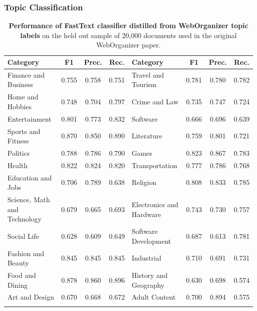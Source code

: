 \documentclass[table]{ai2style/ai2}
\begin{document}
{{\subsubsection{Topic Classification}
\begin{table}[htbp]
\centering
\begin{tabular}{@{}lccc|lccc@{}}
\toprule
{\bf Category} & {\bf F1} & {\bf Prec.} & {\bf Rec.} & {\bf Category} & {\bf F1} & {\bf Prec.} & {\bf Rec.} \\
\midrule
\rowcolor{ai2offwhite} Finance and Business & 0.755 & 0.758 & 0.751 & Travel and Tourism & 0.781 & 0.780 & 0.782 \\
Home and Hobbies & 0.748 & 0.704 & 0.797 & Crime and Law & 0.735 & 0.747 & 0.724 \\
\rowcolor{ai2offwhite} Entertainment & 0.801 & 0.773 & 0.832 & Software & 0.666 & 0.696 & 0.639 \\
Sports and Fitness & 0.870 & 0.850 & 0.890 & Literature & 0.759 & 0.801 & 0.721 \\
\rowcolor{ai2offwhite} Politics & 0.788 & 0.786 & 0.790 & Games & 0.823 & 0.867 & 0.783 \\
Health & 0.822 & 0.824 & 0.820 & Transportation & 0.777 & 0.786 & 0.768 \\
\rowcolor{ai2offwhite} Education and Jobs & 0.706 & 0.789 & 0.638 & Religion & 0.808 & 0.833 & 0.785 \\
Science, Math and Technology & 0.679 & 0.665 & 0.693 & Electronics and Hardware & 0.743 & 0.730 & 0.757 \\
\rowcolor{ai2offwhite} Social Life & 0.628 & 0.609 & 0.649 & Software Development & 0.687 & 0.613 & 0.781 \\
Fashion and Beauty & 0.845 & 0.845 & 0.845 & Industrial & 0.710 & 0.691 & 0.731 \\
\rowcolor{ai2offwhite} Food and Dining & 0.878 & 0.860 & 0.896 & History and Geography & 0.630 & 0.698 & 0.574 \\
Art and Design & 0.670 & 0.668 & 0.672 & Adult Content & 0.700 & 0.894 & 0.575 \\
\midrule
\rowcolor{ai2lightpink} \multicolumn{8}{c}{{\bf Overall (N=20,000): Precision = 0.762, Recall = 0.762}} \\
\bottomrule
\end{tabular}
\caption{\textbf{Performance of FastText classifier distilled from WebOrganizer topic labels} on the held out sample of 20,000 documents used in the original WebOrganizer paper.}
\label{tab:wo_classifier_performance}
\end{table}

}}
\end{document}
